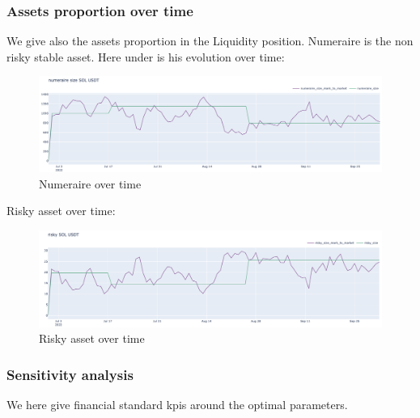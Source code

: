 \documentclass[conference]{IEEEtran}
\begin{document}
\subsubsection{Assets proportion over time}
We give also the assets proportion in the Liquidity position. Numeraire is the non risky stable asset. Here under is his evolution over time:
\begin{figure}[h!]
    \centering
    \includegraphics[scale=0.2]{Plots/numeraire_over_time.png}
    \caption{Numeraire over time}
    \label{fig:conc_liquidity}
\end{figure}
Risky asset over time:
\begin{figure}[h!]
    \centering
    \includegraphics[scale=0.2]{Plots/risky_over_time.png}
    \caption{Risky asset over time}
    \label{fig:conc_liquidity}
\end{figure}
\subsubsection{Sensitivity analysis}
We here give financial standard kpis around the optimal parameters.\\\\
\\
\end{document}
